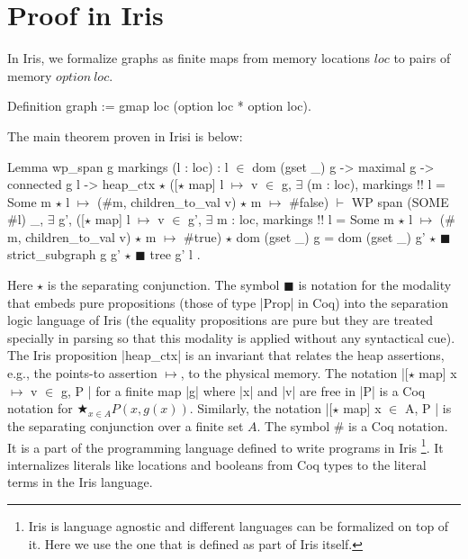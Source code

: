 \documentclass[]{scrartcl}
\newcommand{\loc}{\mathit{loc}}
\newcommand{\option}{\mathit{option}}
\begin{document}
\section{Proof in Iris}
In Iris, we formalize graphs as finite maps from memory locations $\mathit{loc}$ to pairs of memory $\option~\loc$.
\begin{Coq}
Definition graph := gmap loc (option loc * option loc).
\end{Coq}

The main theorem proven in Irisi is  below:
\begin{Coq}
Lemma wp_span g markings (l : loc) :
    l $\in$ dom (gset _) g -> maximal g -> connected g l ->
    heap_ctx $\star$
    ([$\star$ map] l $\mapsto$ v $\in$ g,
       $\exists$ (m : loc), markings !! l = Some m $\star$
          l $\mapsto$ ($\#$m, children_to_val v) $\star$ m $\mapsto$ $\#$false) $\vdash$
    WP span (SOME $\#$l)
    {{ _, $\exists$ g',
            ([$\star$ map] l $\mapsto$ v $\in$ g',
              $\exists$ m : loc, markings !! l = Some m $\star$
                l $\mapsto$ ($\#$m, children_to_val v) $\star$ m $\mapsto$ $\#$true)
           $\star$ dom (gset _) g = dom (gset _) g'
           $\star$ $\scriptscriptstyle\blacksquare$ strict_subgraph g g' $\star$ $\scriptscriptstyle\blacksquare$ tree g' l }}.
\end{Coq}
Here $\star$ is the separating conjunction. The symbol $\scriptscriptstyle\blacksquare$ is notation for the modality that
embeds pure propositions (those of type \Coqe|Prop| in Coq) into
the separation logic language of Iris (the equality propositions are pure but they are treated specially in parsing so that this modality is applied without any syntactical cue).
The Iris proposition \Coqe|heap_ctx| is an invariant that relates the heap
assertions, e.g., the points-to assertion $\mapsto$, to the physical memory.
The notation \Coqe|[$\star$ map] x $
\mapsto$ v $\in$ g, P | for a finite map \Coqe|g| where \Coqe|x| and \Coqe|v| are free in \Coqe|P| is a Coq notation for $
\bigstar_{x \in A} P(x, g(x))$.
Similarly, the notation \Coqe|[$\star$ map] x $\in$ A, P | is the separating
conjunction over a finite set $A$.
The symbol $\#$ is a Coq notation. It is a part of the programming
language defined to write programs in Iris
\footnote{Iris is language agnostic and different languages can be formalized on top of it. Here we use the one that is defined as part of Iris itself.}.
It internalizes literals like locations and booleans from Coq types to the literal terms in the Iris language.
\end{document}
